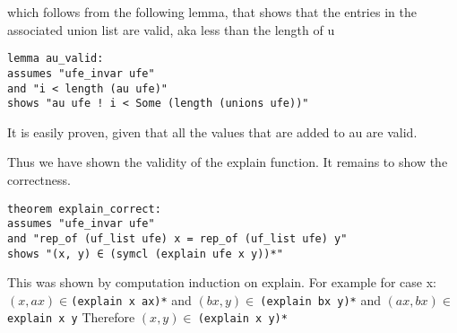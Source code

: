 which follows from the following lemma, that shows that the entries in the associated union list are valid, aka less than the length of u

\begin{lstlisting}
lemma au_valid:
assumes "ufe_invar ufe"
and "i < length (au ufe)"
shows "au ufe ! i < Some (length (unions ufe))"
\end{lstlisting}

It is easily proven, given that all the values that are added to au are valid.

Thus we have shown the validity of the explain function.
It remains to show the correctness.

\begin{lstlisting}[language=isabelle]
theorem explain_correct:
assumes "ufe_invar ufe"
and "rep_of (uf_list ufe) x = rep_of (uf_list ufe) y"
shows "(x, y) ∈ (symcl (explain ufe x y))*"
\end{lstlisting}

This was shown by computation induction on explain. For example for case x:
$(x, ax) \in$\lstinline{(explain x ax)*} and $(bx, y) \in\:$\lstinline{(explain bx y)*} and $(ax, bx) \in\:$\lstinline{explain x y}
Therefore $(x, y) \in\:$\lstinline{(explain x y)*}
